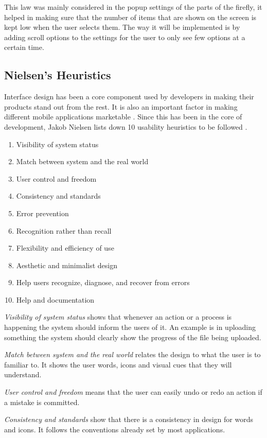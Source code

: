 This law was mainly considered in the popup settings of the parts of the firefly, it helped in making sure that the number of items that are shown on the screen is kept low when the user selects them. The way it will be implemented is by adding scroll options to the settings for the user to only see few options at a certain time.

\subsection{Nielsen's Heuristics}
Interface design has been a core component used by developers in making their products stand out from the rest. It is also an important factor in making different mobile applications marketable \cite{deka2017rico}. Since this has been in the core of development, Jakob Nielsen lists down 10 usability heuristics to be followed \cite{nielsen1990heuristic,nielsen1994enhancing,nielsen}.

\begin{enumerate} 
\item Visibility of system status
\item Match between system and the real world
\item User control and freedom
\item Consistency and standards
\item Error prevention
\item Recognition rather than recall
\item Flexibility and efficiency of use
\item Aesthetic and minimalist design
\item Help users recognize, diagnose, and recover from errors
\item Help and documentation
\end{enumerate}

\textit{Visibility of system status} shows that whenever an action or a process is happening the system should inform the users of it. An example is in uploading something the system should clearly show the progress of the file being uploaded.

\textit{Match between system and the real world} relates the design to what the user is to familiar to. It shows the user words, icons and visual cues that they will understand.
 
\textit{User control and freedom} means that the user can easily undo or redo an action if a mistake is committed. 

\textit{Consistency and standards} show that there is a consistency in design for words and icons. It follows the conventions already set by most applications. 
 
